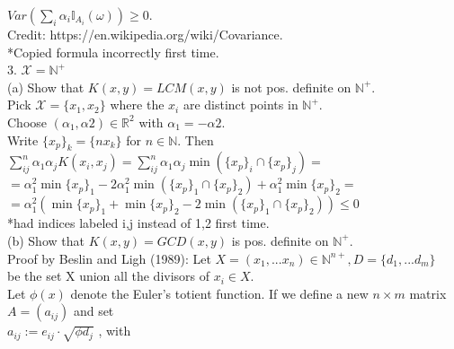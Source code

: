 \documentclass[18pt]{article}
\begin{document}
\begin{flushleft}
$Var(\sum_i \alpha_i \mathbb{I}_{A_i}(\omega)) \geq 0$.\\
\vspace{.4cm}
Credit: https://en.wikipedia.org/wiki/Covariance.\\
*Copied formula incorrectly first time.\\
\vspace{.4cm}
3. $\mathcal{X} =\mathbb{N}^{+}$\\
\vspace{.4cm}
(a) Show that $K(x,y)=LCM(x,y)$ is not pos. definite on $\mathbb{N}^{+}$.\\
\vspace{.4cm}
Pick $\mathcal{X} = \{ x_1,x_2\}$ where the $x_i$ are distinct points in $\mathbb{N}^{+}$.\\
Choose $(\alpha_1,\alpha2) \in \mathbb{R}^2$ with $\alpha_1=-\alpha2$. \\
\vspace{.4cm}
Write $\{x_p\}_k=\{n x_k\}$ for $n \in \mathbb{N}$. Then \\
\vspace{.4cm}
$\sum_{ij}^n \alpha_1 \alpha_j K(x_i,x_j)=\sum_{ij}^n \alpha_1 \alpha_j \min(\{x_p\}_i \cap \{x_p\}_j)=$\\
$=\alpha_1^2 \min\{x_p\}_1-2 \alpha_1^2 \min(\{x_p\}_1 \cap \{x_p\}_2)+\alpha_1^2 \min\{x_p\}_2=$\\
$=\alpha_1^2\left(\min\{x_p\}_1+\min\{x_p\}_2-2 \min(\{x_p\}_1 \cap \{x_p\}_2)\right) \leq 0$\\
\vspace{.4cm}
*had indices labeled i,j instead of 1,2 first time.\\
\vspace{.4cm}
(b) Show that $K(x,y)=GCD(x,y)$ is pos. definite on $\mathbb{N}^{+}$.\\
\vspace{.5cm}
Proof by Beslin and Ligh (1989):
Let $X=(x_1,...x_n) \in \mathbb{N}^{n+}, D=\{d_1,...d_m\}$\\
be the set X union all the divisors of $x_i \in X$.\\
\vspace{.5cm}
Let $\phi(x)$ denote the Euler's totient function. If we define a new $n \times m$ matrix\\
$A=(a_{ij})$ and set\\
\vspace{.4cm}
\hspace{4cm} $a_{ij}:=e_{ij} \cdot \sqrt{\phi{d_j}}$ , with
\vspace{.4cm}


\end{flushleft}
\end{document}
